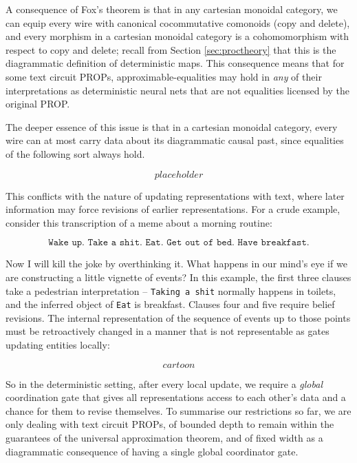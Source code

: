 \begin{fullwidth}
\begin{theorem}
\end{theorem}

A consequence of Fox's theorem is that in any cartesian monoidal category, we can equip every wire with canonical cocommutative comonoids (copy and delete), and every morphism in a cartesian monoidal category is a cohomomorphism with respect to copy and delete; recall from Section \ref{sec:proctheory} that this is the diagrammatic definition of deterministic maps. This consequence means that for some text circuit PROPs, approximable-equalities may hold in \emph{any} of their interpretations as deterministic neural nets that are not equalities licensed by the original PROP.

\begin{example}

\end{example}

The deeper essence of this issue is that in a cartesian monoidal category, every wire can at most carry data about its diagrammatic causal past, since equalities of the following sort always hold.

\[placeholder\]

This conflicts with the nature of updating representations with text, where later information may force revisions of earlier representations. For a crude example, consider this transcription of a meme about a morning routine:

\[\texttt{Wake up. Take a shit. Eat. Get out of bed. Have breakfast.}\]

Now I will kill the joke by overthinking it. What happens in our mind's eye if we are constructing a little vignette of events? In this example, the first three clauses take a pedestrian interpretation -- \texttt{Taking a shit} normally happens in toilets, and the inferred object of \texttt{Eat} is breakfast. Clauses four and five require belief revisions. The internal representation of the sequence of events up to those points must be retroactively changed in a manner that is not representable as gates updating entities locally:

\[cartoon\]

So in the deterministic setting, after every local update, we require a \emph{global} coordination gate that gives all representations access to each other's data and a chance for them to revise themselves. To summarise our restrictions so far, we are only dealing with text circuit PROPs, of bounded depth to remain within the guarantees of the universal approximation theorem, and of fixed width as a diagrammatic consequence of having a single global coordinator gate.


\end{fullwidth}
